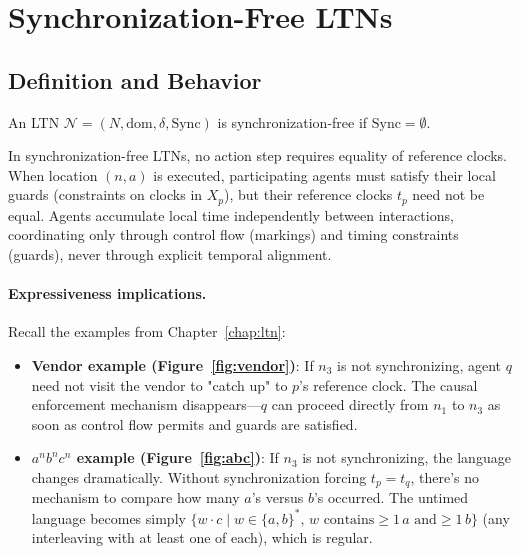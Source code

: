 \section{Synchronization-Free LTNs}
\label{sec:syncfree}

\subsection{Definition and Behavior}

\begin{definition}
\label{def:syncfree}
An LTN $\mathcal{N} = (N, \text{dom}, \delta, \text{Sync})$ is \textsf{synchronization-free} if $\text{Sync} = \emptyset$.
\end{definition}

In synchronization-free LTNs, no action step requires equality of reference clocks. When location $(n, a)$ is executed, participating agents must satisfy their local guards (constraints on clocks in $X_p$), but their reference clocks $t_p$ need not be equal. Agents accumulate local time independently between interactions, coordinating only through control flow (markings) and timing constraints (guards), never through explicit temporal alignment.

\paragraph{Expressiveness implications.} Recall the examples from Chapter~\ref{chap:ltn}:

\begin{itemize}
\item \textbf{Vendor example (Figure~\ref{fig:vendor})}: If $n_3$ is not synchronizing, agent $q$ need not visit the vendor to "catch up" to $p$'s reference clock. The causal enforcement mechanism disappears—$q$ can proceed directly from $n_1$ to $n_3$ as soon as control flow permits and guards are satisfied.

\item \textbf{$a^n b^n c^n$ example (Figure~\ref{fig:abc})}: If $n_3$ is not synchronizing, the language changes dramatically. Without synchronization forcing $t_p = t_q$, there's no mechanism to compare how many $a$'s versus $b$'s occurred. The untimed language becomes simply $\{w \cdot c \mid w \in \{a, b\}^*, \, w \text{ contains} \geq 1 \, a \text{ and} \geq 1 \, b\}$ (any interleaving with at least one of each), which is regular.
\end{itemize}

